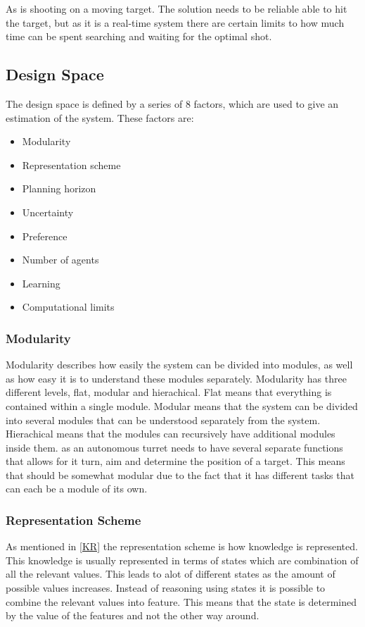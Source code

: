 As \name is shooting on a moving target. The solution needs to be reliable able
to hit the target, but as it is a real-time system there are certain limits to
how much time can be spent searching and waiting for the optimal shot.


\subsection{Design Space}
The design space is defined by a series of 8 factors, which are used to give an
estimation of the system. These factors are:

\begin{itemize}
   \item Modularity
   \item Representation scheme 
   \item Planning horizon 
   \item Uncertainty
   \item Preference
   \item Number of agents
   \item Learning
   \item Computational limits
\end{itemize}

\subsubsection{Modularity}
Modularity describes how easily the system can be divided into modules, as well
as how easy it is to understand these modules separately. Modularity has three
different levels, flat, modular and hierachical. Flat means that everything is
contained within a single module. Modular means that the system can be divided
into several modules that can be understood separately from the system.
Hierachical means that the modules can recursively have additional modules
inside them. \name as an autonomous turret needs to have several separate
functions that allows for it turn, aim and determine the position of a target.
This means that \name should be somewhat modular due to the fact that it has
different tasks that can each be a module of its own.

\subsubsection{Representation Scheme}
As mentioned in \autoref{KR} the representation scheme is how knowledge is
represented. This knowledge is usually represented in terms of states which are
combination of all the relevant values. This leads to alot of different states
as the amount of possible values increases. Instead of reasoning using states it
is possible to combine the relevant values into feature. This means that the
state is determined by the value of the features and not the other way around.
 





